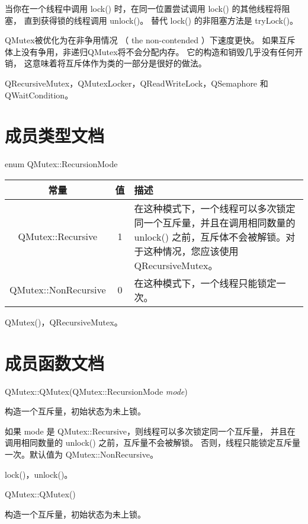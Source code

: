 当你在一个线程中调用 lock() 时，在同一位置尝试调用 lock() 的其他线程将阻塞，
直到获得锁的线程调用 unlock()。
替代 lock() 的非阻塞方法是 tryLock()。

QMutex被优化为在非争用情况 （ the non-contended ）下速度更快。
如果互斥体上没有争用，非递归QMutex将不会分配内存。
它的构造和销毁几乎没有任何开销，
这意味着将互斥体作为类的一部分是很好的做法。

\begin{seeAlso}
QRecursiveMutex，QMutexLocker，QReadWriteLock，QSemaphore 和 QWaitCondition。
\end{seeAlso}

\section{成员类型文档}

enum QMutex::RecursionMode

\begin{tabular}{|c|c|m{20em}|}
\hline
常量 	&值& 	描述 \\ 
\hline
QMutex::Recursive &	1 	&在这种模式下，一个线程可以多次锁定同一个互斥量，并且在调用相同数量的 unlock() 之前，互斥体不会被解锁。对于这种情况，您应该使用 QRecursiveMutex。 \\
\hline
QMutex::NonRecursive &	0 	&在这种模式下，一个线程只能锁定一次。\\
\hline
\end{tabular}

\begin{seeAlso}
QMutex()，QRecursiveMutex。
\end{seeAlso}

\section{成员函数文档}

QMutex::QMutex(QMutex::RecursionMode \emph{mode})

构造一个互斥量，初始状态为未上锁。

如果 mode 是 QMutex::Recursive，则线程可以多次锁定同一个互斥量，
并且在调用相同数量的 unlock() 之前，互斥量不会被解锁。
否则，线程只能锁定互斥量一次。默认值为 QMutex::NonRecursive。

\begin{seeAlso}
lock()，unlock()。
\end{seeAlso}

QMutex::QMutex()

构造一个互斥量，初始状态为未上锁。

